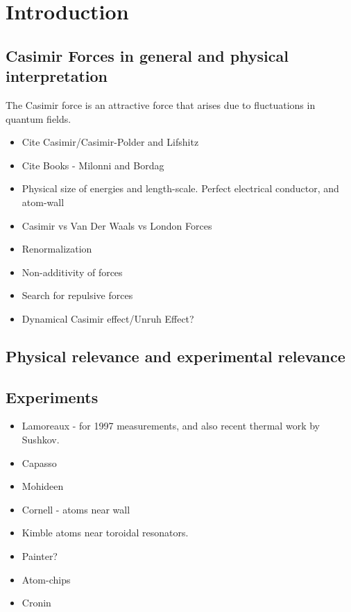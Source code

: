\chapter{Introduction}



\section{Casimir Forces in general and physical interpretation}

The Casimir force is an attractive force that arises due to fluctuations in quantum fields.  

\begin{itemize}
\item Cite Casimir/Casimir-Polder and Lifshitz
\item Cite Books - Milonni and Bordag
\item Physical size of energies and length-scale.  Perfect electrical conductor, and atom-wall
\item Casimir vs Van Der Waals vs London Forces
\item Renormalization
\item Non-additivity of forces
\item Search for repulsive forces
\item Dynamical Casimir effect/Unruh Effect?
\end{itemize}

\section{Physical relevance and experimental relevance}

\section{Experiments}

\begin{itemize}
\item Lamoreaux - for 1997 measurements, and also recent thermal work by Sushkov.
\item Capasso
\item Mohideen  
\item Cornell - atoms near wall
\item Kimble atoms near toroidal resonators.  
\item Painter?
\item Atom-chips
\item Cronin
\end{itemize}

